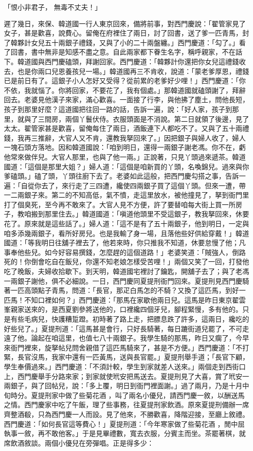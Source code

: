 「恨小非君子，  無毒不丈夫！」

遲了幾日，來保、韓道國一行人東京回來，備將前事，對西門慶說：「翟管家見了女子，甚是歡喜，說費心。留俺在府裡住了兩日，討了回書，送了爹一匹青馬，封了韓夥計女兒五十兩銀子禮錢，又與了小的二十兩盤纏。」西門慶道：「勾了。」看了回書，書中無非是知感不盡之意。自此兩家都下眷生名字，稱呼親家，不在話下。韓道國與西門慶磕頭，拜謝回家。西門慶道：「韓夥計你還把你女兒這禮錢收去，也是你兩口兒恩養孩兒一場。」韓道國再三不肯收，說道：「蒙老爹厚恩，禮錢已是前日有了。這銀子小人怎好又受得？從前累的老爹好少哩！」西門慶道：「你不依，我就惱了。你將回家，不要花了，我有個處。」那韓道國就磕頭謝了，拜辭回去。老婆見他漢子來家，滿心歡喜。一面接了行李，與他拂了塵土，問他長短，孩子到那里好麼？這道國把往回一路的話，告訴一遍，說：「好人家，孩子到那里，就與了三間房，兩個丫鬟伏侍。衣服頭面是不消說。第二日就領了後邊，見了太太。翟管家甚是歡喜，留俺每住了兩日，酒飯連下人都吃不了。又與了五十兩禮錢，我再三推辭，大官人又不肯，還教我拏回來了。」因把銀子與婦人收了，婦人一塊石頭方落地。因和韓道國說：「咱到明日，還得一兩銀子謝老馮。你不在，虧他常來做伴兒。大官人那里，也與了他一兩。」正說著，只見丫頭過來遞茶。韓道國道：「這個是那里大姐？」婦人道：「這個是咱新買的丫頭，名喚錦兒。過來與你爹磕頭。」磕了頭，丫頭往廚下去了。老婆如此這般，把西門慶勾搭之事，告訴一遍：「自從你去了，來行走了三四遭，纔使四兩銀子買了這個丫頭。但來一遭，帶一二兩銀子來。第二的不知高低，氣不憤，走這里放水，被他撞見了，拏到衙門里打了個臭死，至今再不敢來了。大官人見不方便，許了要替咱每大街上買一所房子，教咱搬到那里住去。」韓道國道：「嗔道他頭里不受這銀子，教我拏回來，休要花了。原來就是這些話了。」婦人道：「這不是有了五十兩銀子，他到明日，一定與咱多添幾兩銀子，看所好房兒。也是我輸了身一場，且落他些好供給穿戴！」韓道國道：「等我明日往舖子裡去了，他若來時，你只推我不知道，休要怠慢了他；凡事奉他些兒。如今好容易撰錢，怎麼趕的這個道路！」老婆笑道：「賊強人，倒路死的！你倒會吃自在飯兒，你還不知老娘怎樣受苦哩！」兩個又笑了一回，打發他吃了晚飯，夫婦收拾歇下。到天明，韓道國宅裡討了鑰匙，開舖子去了；與了老馮一兩銀子謝他，俱不必細說。一日，西門慶同夏提刑衙門回來。夏提刑見西門慶騎著一匹高頭點子青馬，問道：「長官，那疋白馬怎的不騎？又換了這匹馬，到好一匹馬！不知口裡如何？」西門慶道：「那馬在家歇他兩日兒。這馬是昨日東京翟雲峯親家送來的，是西夏劉參將送他的，口裡纔四個牙兒，腳程緊慢，多有他的。只是有些毛病兒，快護糟踅蹬。初時著了路上走，把膘息跌了許多，這兩日，纔吃的好些兒了。」夏提刑道：「這馬甚是會行，只好長騎著，每日蹗街道兒罷了，不可走遠了他。論起在咱這里，也值七八十兩銀子。我學生騎的那馬，昨日又瘸了，今早來衙門裡來，旋拏帖兒問舍親借了這匹馬騎來了，甚是不方便。」西門慶道：「不打緊，長官沒馬，我家中還有一匹黃馬，送與長官罷。」夏提刑舉手道；「長官下顧，學生奉價過來。」西門慶道：「不須計較，學生到家就差人送來。」兩個走到西街口上，西門慶舉手分路來家；到家就使玳安把馬送去。夏提刑見了大喜，賞了玳安一兩銀子，與了回帖兒，說：「多上覆，明日到衙門裡面謝。」過了兩月，乃是十月中旬時分。夏提刑家中做了些菊花酒 ，叫了兩名小優兒，請西門慶一敘，以酬送馬之情。西門慶家中吃了午飯，理了些事務，往夏提刑家飲酒。原來夏提刑備辦一席齊整酒殽，只為西門慶一人而設。見了他來，不勝歡喜，降階迎接，至廳上敘禮。西門慶道：「如何長官這等費心！」夏提刑道：「今年寒家做了些菊花酒 ，閒中屈執事一敘，再不敢他客。」于是見畢禮數，寬去衣服，分賓主而坐。茶罷著棋，就席飲酒敘談。兩個小優兒在旁彈唱。正是得多少：

